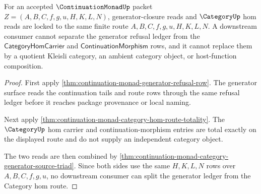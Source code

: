 \begin{theorem}
\label{thm:continuation-monad-root-generator-category-lock}
For an accepted $\ContinuationMonadUp$ packet $Z=(A,B,C,f,g,u,H,K,L,N)$, generator-closure reads and $\CategoryUp$ hom reads are locked to the same finite route $A,B,C,f,g,u,H,K,L,N$. A downstream consumer cannot separate the generator refusal ledger from the $\mathsf{CategoryHomCarrier}$ and $\mathsf{ContinuationMorphism}$ rows, and it cannot replace them by a quotient Kleisli category, an ambient category object, or host-function composition.
\end{theorem}
\begin{proof}
First apply \autoref{thm:continuation-monad-generator-refusal-row}. The generator surface reads the continuation tails and route rows through the same refusal ledger before it reaches package provenance or local naming.

Next apply \autoref{thm:continuation-monad-category-hom-route-totality}. The $\CategoryUp$ hom carrier and continuation-morphism entries are total exactly on the displayed route and do not supply an independent category object.

The two reads are then combined by \autoref{thm:continuation-monad-category-generator-source-triad}. Since both sides use the same $H,K,L,N$ rows over $A,B,C,f,g,u$, no downstream consumer can split the generator ledger from the Category hom route.
\end{proof}

